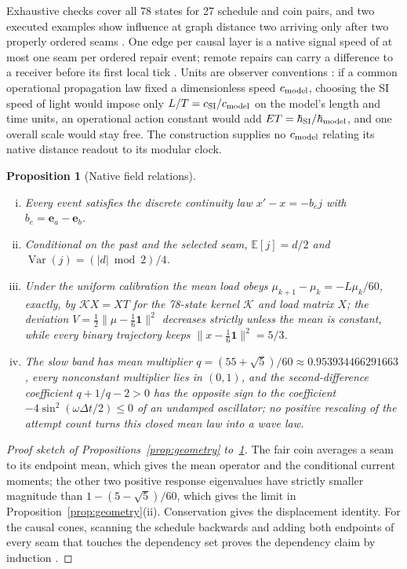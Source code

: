 \documentclass[11pt]{article}
\newtheorem{proposition}[theorem]{Proposition}
\theoremstyle{definition}
\theoremstyle{remark}
\theoremstyle{plain}
\newcommand{\Ex}{\mathbb{E}}
\begin{document}
Exhaustive checks cover all 78 states for 27 schedule and coin pairs, and two
executed examples show influence at graph distance two arriving only after
two properly ordered seams \cite{csCAUS}. One edge per causal layer is a
native signal speed of at most one seam per ordered repair event; remote
repairs can carry a difference to a receiver before its first local tick
\cite{nativeRecovery}. Units are observer conventions \cite{csCALIB}: if a
common operational propagation law fixed a dimensionless speed
$c_{\rm model}$, choosing the SI speed of light would impose only
$L/T=c_{\rm SI}/c_{\rm model}$ on the model's length and time units, an
operational action constant would add $ET=\hbar_{\rm SI}/\hbar_{\rm model}$,
and one overall scale would stay free. The construction supplies no
$c_{\rm model}$ relating its native distance readout to its modular clock.

\begin{proposition}[Native field relations]
\label{prop:fields}
\begin{enumerate}[(i)]
\item Every event satisfies the discrete continuity law $x'-x=-b_ej$ with
$b_e=\mathbf e_a-\mathbf e_b$.
\item Conditional on the past and the selected seam,
$\Ex[j]=d/2$ and $\operatorname{Var}(j)=(\lvert d\rvert\bmod2)/4$.
\item Under the uniform calibration the mean load obeys
$\mu_{k+1}-\mu_k=-L\mu_k/60$, exactly, by $\mathcal KX=XT$ for the 78-state
kernel $\mathcal K$ and load matrix $X$; the deviation
$V=\frac12\lVert\mu-\frac16\mathbf 1\rVert^2$ decreases strictly unless the
mean is constant, while every binary trajectory keeps
$\lVert x-\frac16\mathbf 1\rVert^2=5/3$.
\item The slow band has mean multiplier $q=(55+\sqrt5)/60\approx0.953934466291663$,
every nonconstant multiplier lies in $(0,1)$, and the second-difference
coefficient $q+1/q-2>0$ has the opposite sign to the coefficient
$-4\sin^2(\omega\Delta t/2)\le0$ of an undamped oscillator; no positive
rescaling of the attempt count turns this closed mean law into a wave law.
\end{enumerate}
\end{proposition}

\begin{proof}[Proof sketch of Propositions~\ref{prop:geometry}
to~\ref{prop:fields}]
The fair coin averages a seam to its endpoint mean, which gives the mean
operator and the conditional current moments; the other two positive response
eigenvalues have strictly smaller magnitude than $1-(5-\sqrt5)/60$, which
gives the limit in Proposition~\ref{prop:geometry}(ii). Conservation gives
the displacement identity. For the causal cones, scanning the schedule
backwards and adding both endpoints of every seam that touches the
dependency set proves the dependency claim by induction
\cite{csSLOW,csCAUS,csFIELDS}.
\end{proof}
\end{document}

